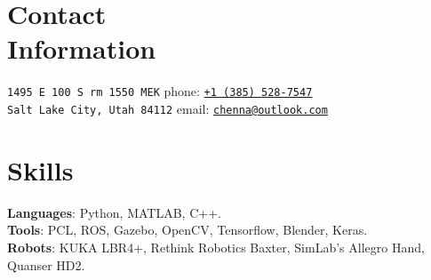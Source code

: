 \documentclass[letterpaper, margin, line, 10.5pt]{resume}
\begin{document}
\author{Kautilya Chenna}

\begin{resume}

    
    \section{\myheadingstyle Contact \\ Information}

    \texttt{1495 E 100 S rm 1550 MEK}                            \hfill phone: \texttt{\href{tel:13855287547}{+1 (385) 528-7547}}          \vspace{0mm}\\\vspace{0mm}%
    \texttt{Salt Lake City, Utah 84112}                          \hfill email: \texttt{\href{mailto:chenna@outlook.com}{chenna@outlook.com}}       %


    
	\sectionseperator
	\section{\myheadingstyle Skills} 
	
	\textbf{Languages}: Python, MATLAB, C++. \\[1mm]
	\textbf{Tools}: PCL, ROS, Gazebo, OpenCV, Tensorflow, Blender, Keras. \\[1mm]
	\textbf{Robots}: KUKA LBR4+, Rethink Robotics Baxter, SimLab's Allegro Hand, Quanser HD2.%


    
    \sectionseperator

\end{resume}
\end{document}
